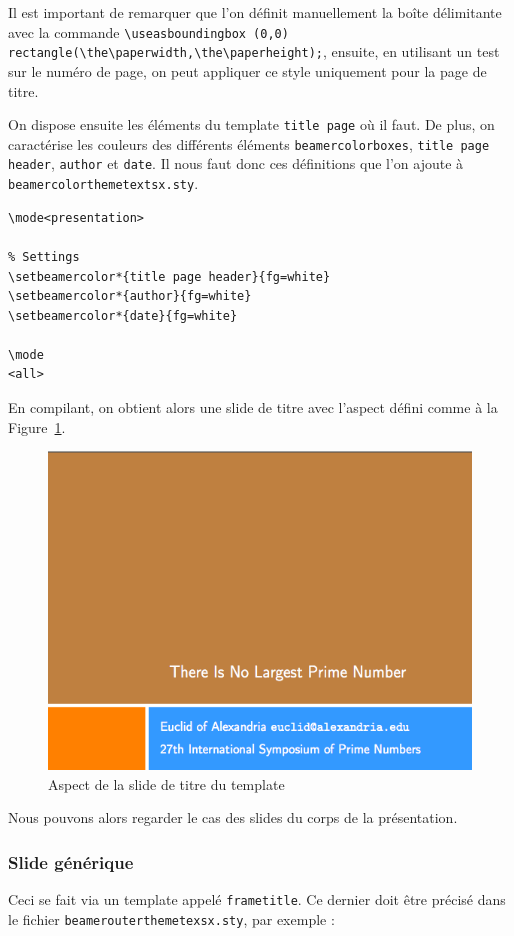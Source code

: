 Il est important de remarquer que l'on définit manuellement la boîte délimitante avec la commande \texttt{\textbackslash useasboundingbox (0,0) rectangle(\textbackslash the\textbackslash paperwidth,\textbackslash the\textbackslash paperheight);}, ensuite, en utilisant un test sur le numéro de page, on peut appliquer ce style uniquement pour la page de titre.

On dispose ensuite les éléments du template \texttt{title page} où il faut. De plus, on caractérise les couleurs des différents éléments \texttt{beamercolorboxes}, \texttt{title page header}, \texttt{author} et \texttt{date}. Il nous faut donc ces définitions que l'on ajoute à \texttt{beamercolorthemetextsx.sty}.

\begin{lstlisting}[language={[LaTeX]TeX}]
\mode<presentation>

% Settings
\setbeamercolor*{title page header}{fg=white}
\setbeamercolor*{author}{fg=white}
\setbeamercolor*{date}{fg=white}

\mode
<all>
\end{lstlisting}

En compilant, on obtient alors une slide de titre avec l'aspect défini comme à la Figure~\ref{fig:beamer-custom-title-slide}.

\begin{figure}[ht]
\centering
	\includegraphics[width=.5\textwidth]{images/Beamer/custom-title-slide}
	\caption{Aspect de la slide de titre du template}
	\label{fig:beamer-custom-title-slide}
\end{figure}

Nous pouvons alors regarder le cas des slides du corps de la présentation.

\subsubsection{Slide générique}
Ceci se fait via un template appelé \texttt{frametitle}. Ce dernier doit être précisé dans le fichier \texttt{beamerouterthemetexsx.sty}, par exemple :


